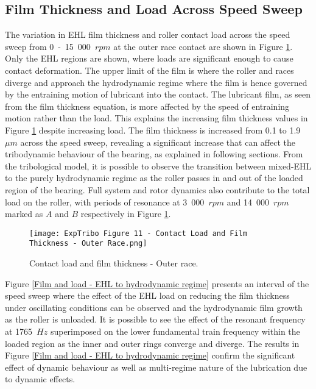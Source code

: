 \subsection{Film Thickness and Load Across Speed Sweep} 
The variation in EHL film thickness and roller contact load across the speed sweep from 0~-~15~000~$rpm$ at the outer race contact are shown in Figure \ref{Contact load and film thickness - Outer race}. Only the EHL regions are shown, where loads are significant enough to cause contact deformation. The upper limit of the film is where the roller and races diverge and approach the hydrodynamic regime where the film is hence governed by the entraining motion of lubricant into the contact. The lubricant film, as seen from the film thickness equation, is more affected by the speed of entraining motion rather than the load. This explains the increasing film thickness values in Figure \ref{Contact load and film thickness - Outer race} despite increasing load. The film thickness is increased from 0.1 to 1.9~$\mu m$ across the speed sweep, revealing a significant increase that can affect the tribodynamic behaviour of the bearing, as explained in following sections. From the tribological model, it is possible to observe the transition between mixed-EHL to the purely hydrodynamic regime as the roller passes in and out of the loaded region of the bearing. Full system and rotor dynamics also contribute to the total load on the roller, with periods of resonance at 3~000~$rpm$ and 14~000~$rpm$ marked as $A$ and $B$ respectively in Figure \ref{Contact load and film thickness - Outer race}.

\begin{figure}
	\texttt{[image: ExpTribo Figure 11 - Contact Load and Film Thickness - Outer Race.png]}
	\caption{Contact load and film thickness - Outer race.}
	\label{Contact load and film thickness - Outer race}
\end{figure}

Figure \ref{Film and load - EHL to hydrodynamic regime} presents an interval of the speed sweep where the effect of the EHL load on reducing the film thickness under oscillating conditions can be observed and the hydrodynamic film growth as the roller is unloaded. It is possible to see the effect of the resonant frequency at 1765~$Hz$ superimposed on the lower fundamental train frequency within the loaded region as the inner and outer rings converge and diverge. The results in Figure \ref{Film and load - EHL to hydrodynamic regime} confirm the significant effect of dynamic behaviour as well as multi-regime nature of the lubrication due to dynamic effects.

